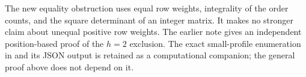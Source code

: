 \documentclass[11pt]{article}
\begin{document}
The new equality obstruction uses equal row weights, integrality of
the order counts, and the square determinant of an integer matrix.
It makes no stronger claim about unequal positive row weights.
The earlier note  gives an
independent position-based proof of the $h=2$ exclusion. The exact
small-profile enumeration in 
and its JSON output is retained as a computational companion; the
general proof above does not depend on it.
\end{document}
